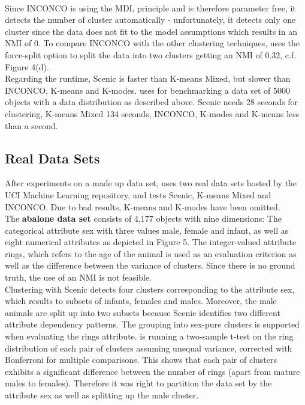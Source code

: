 \documentclass[conference]{IEEEtran}
\begin{document}
\\
Since INCONCO is using the MDL principle and is therefore parameter free, it detects the number of cluster automatically - unfortunately, it detects only one cluster since the data does not fit to the model assumptions which results in an NMI of 0. To compare INCONCO with the other clustering techniques, \cite{scenic} uses the force-split option to split the data into two clusters getting an NMI of 0.32, c.f. Figure 4(d)\cite{scenic}.
\\
Regarding the runtime, Scenic is faster than K-means Mixed, but slower than INCONCO, K-means and K-modes. \cite{scenic} uses for benchmarking a data set of 5000 objects with a data distribution as described above. Scenic needs 28 seconds for clustering, K-means Mixed 134 seconds, INCONCO, K-modes and K-means less than a second.
\subsection{Real Data Sets}
After experiments on a made up data set, \cite{scenic} uses two real data sets hosted by the UCI Machine Learning repository\cite{uci}, and tests Scenic, K-means Mixed and INCONCO. Due to bad results, K-means and K-modes have been omitted.
\\
The \textbf{abalone data set} consists of 4,177 objects with nine dimensions: The categorical attribute sex with three values male, female and infant, as well as eight numerical attributes as depicted in Figure 5\cite{scenic}. The integer-valued attribute rings, which refers to the age of the animal is used as an evaluation criterion as well as the difference between the variance of clusters. Since there is no ground truth, the use of an NMI is not feasible.
\\
Clustering with Scenic detects four clusters corresponding to the attribute sex, which results to subsets of infants, females and males. Moreover, the male animals are split up into two subsets because Scenic identifies two different attribute dependency patterns.
The grouping into sex-pure clusters is supported when evaluating the rings attribute. \cite{scenic} is running a two-sample t-test on the ring distribution of each pair of clusters assuming unequal variance, corrected with Bonferroni for multiple comparisons. This shows that each pair of clusters exhibits a significant difference between the number of rings (apart from mature males to females). Therefore it was right to partition the data set by the attribute sex as well as splitting up the male cluster.
\end{document}
